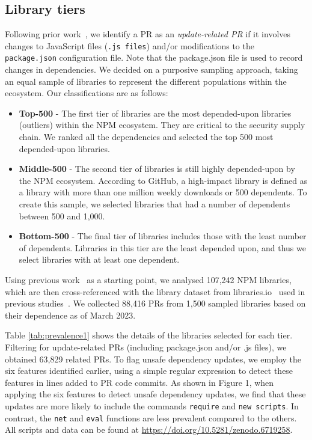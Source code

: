 \documentclass[sigconf,screen]{acmart}
\newcommand{\droptextshadow}[2]{%
    \tikz[baseline,outer sep=0pt, inner sep=0pt]{
    \node[#1!40!black] at (0,-0.1ex) {#2};
    \node[white] at (0,0) {#2};
}%
}
\newcommand{\DOIbox}[1]{
\tcbsidebyside[
        bicolor,
        sidebyside,
        sidebyside adapt=both,
        sidebyside gap=5pt,
        top=0pt,left=0pt,right=0pt,bottom=0pt,
        boxrule=0pt,rounded corners,
        interior style={top color=LHScolor,bottom color=LHScolor!60!black},
        segmentation style={top color=ABlue,bottom color=ABlue!60!black},
]{%
\droptextshadow{LHScolor}{DOI}%
}{%
\droptextshadow{ABlue}{\href{http://dx.doi.org/#1}{#1}}%
}%
}
\newcommand\toppkg{Top-500}
\newcommand\midpkg{Middle-500}
\newcommand\lowpkg{Bottom-500}
\begin{document}
\begin{sloppy}
\subsection{Library tiers}

Following prior work~\citep{GarrettICSE-NIER19}, we identify a PR as an \textit{update-related PR} if it involves changes to JavaScript files (\texttt{.js files}) and/or modifications to the \texttt{package.json} configuration file.
Note that the package.json file is used to record changes in dependencies.
We decided on a purposive sampling approach, taking an equal sample of libraries to represent the different populations within the ecosystem.
Our classifications are as follows:
\begin{itemize}
    \item \textbf{\toppkg} - The first tier of libraries are the most depended-upon libraries (outliers) within the NPM ecosystem. They are critical to the security supply chain. We ranked all the dependencies and selected the top 500 most depended-upon libraries. 
    \item \textbf{\midpkg} - The second tier of libraries is still highly depended-upon by the NPM ecosystem.
    According to GitHub, a high-impact library is defined as a library with more than one million weekly downloads or 500 dependents.
    To create this sample, we selected libraries that had a number of dependents between 500 and 1,000.
    \item \textbf{\lowpkg} - The final tier of libraries includes those with the least number of dependents. Libraries in this tier are the least depended upon, and thus we select libraries with at least one dependent.
\end{itemize}

Using previous work~\citep{Wattanakriengkrai:arxiv2022} as a starting point, we analysed 107,242 NPM libraries, which are then cross-referenced with the library dataset from libraries.io~\citep{Librarie95:online} used in previous studies~\citep{Golzadeh:2019, Zerouali:emse2022, Abdalkareem:emse2020}.
We collected 88,416 PRs from 1,500 sampled libraries based on their dependence as of March 2023.

Table \ref{tab:prevalence1} shows the details of the libraries selected for each tier. 
Filtering for update-related PRs (including package.json and/or .js files), we obtained 63,829 related PRs.
To flag unsafe dependency updates, we employ the six features identified earlier, using a simple regular expression to detect these features in lines added to PR code commits.
As shown in Figure 1, when applying the six features to detect unsafe dependency updates, we find that these updates are more likely to include the commands \texttt{require} and \texttt{new scripts}.
In contrast, the \texttt{net} and \texttt{eval} functions are less prevalent compared to the others.
All scripts and data can be found at 
\url{https://doi.org/10.5281/zenodo.6719258}.




\end{sloppy}
\end{document}
